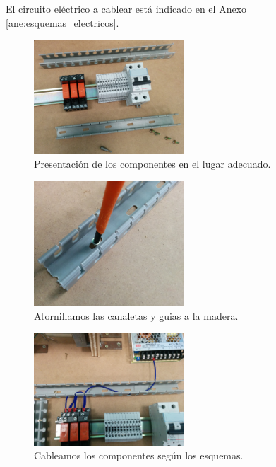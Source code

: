 El circuito eléctrico a cablear está indicado en el Anexo \ref{ane:esquemas_electricos}.
    \begin{figure}[H]
            \centering
            \includegraphics[width=0.5\textwidth]{images/maqueta/IMG_20150324_162200.jpg}
            \caption{Presentación de los componentes en el lugar adecuado.}
            \label{fig:maque_montaje5}
    \end{figure}
    \begin{figure}[H]
            \centering
            \includegraphics[width=0.5\textwidth]{images/maqueta/IMG_20150324_162705.jpg}
            \caption{Atornillamos las canaletas y guias a la madera.}
            \label{fig:maque_montaje6}
    \end{figure}
    \begin{figure}[H]
            \centering
            \includegraphics[width=0.5\textwidth]{images/maqueta/IMG_20150324_173716.jpg}
            \caption{Cableamos los componentes según los esquemas.}
            \label{fig:maque_montaje7}
    \end{figure}
